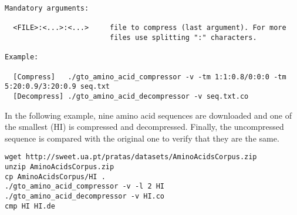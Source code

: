 \begin{lstlisting}
Mandatory arguments:                                                   
                                                                       
  <FILE>:<...>:<...>     file to compress (last argument). For more    
                         files use splitting ":" characters.         
                                                                       
Example:                                                               
                                                                       
  [Compress]   ./gto_amino_acid_compressor -v -tm 1:1:0.8/0:0:0 -tm 5:20:0.9/3:20:0.9 seq.txt 
  [Decompress] ./gto_amino_acid_decompressor -v seq.txt.co  
\end{lstlisting}
In the following example, nine amino acid sequences are downloaded and one of the smallest (HI) is compressed and decompressed. Finally, the uncompressed sequence is compared with the original one to verify that they are the same.
\begin{lstlisting}
wget http://sweet.ua.pt/pratas/datasets/AminoAcidsCorpus.zip
unzip AminoAcidsCorpus.zip
cp AminoAcidsCorpus/HI .
./gto_amino_acid_compressor -v -l 2 HI
./gto_amino_acid_decompressor -v HI.co
cmp HI HI.de
\end{lstlisting}